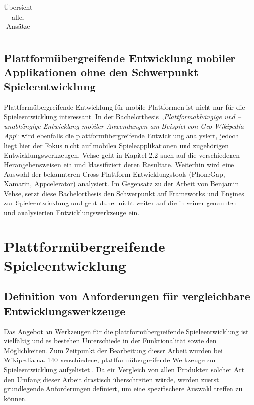\begin{table}[htbp]
{\begin{tabular}{|c|c|p{5cm}|p{6cm}|p{}|}
		\end{tabular}
	}
	\caption{Übersicht aller Ansätze}
	\label{table_all_approaches}
\end{table}

\section{Plattformübergreifende Entwicklung mobiler Applikationen ohne den Schwerpunkt Spieleentwicklung}
Plattformübergreifende Entwicklung für mobile Plattformen ist nicht nur für die Spieleentwicklung interessant.
In der Bachelorthesis „\textit{Plattformabhängige und –unabhängige Entwicklung mobiler Anwendungen am Beispiel von Geo-Wikipedia-App}“ \citep{cross_plattform_development_vehse} wird ebenfalls die plattformübergreifende Entwicklung analysiert, jedoch liegt hier der Fokus nicht auf mobilen Spieleapplikationen und zugehörigen Entwicklungswerkzeugen. Vehse geht in Kapitel 2.2 auch auf die verschiedenen Herangehensweisen ein und klassifiziert deren Resultate. Weiterhin wird eine Auswahl der bekannteren Cross-Plattform Entwicklungstools (PhoneGap, Xamarin, Appcelerator) analysiert. Im Gegensatz zu der Arbeit von Benjamin Vehse, setzt diese Bachelorthesis den Schwerpunkt auf Frameworks und Engines zur Spieleentwicklung und geht daher nicht weiter auf die in seiner genannten und analysierten Entwicklungswerkzeuge ein.


\chapter{Plattformübergreifende Spieleentwicklung}

\section{Definition von Anforderungen für vergleichbare Entwicklungswerkzeuge}
Das Angebot an Werkzeugen für die plattformübergreifende Spieleentwicklung ist vielfältig und es bestehen Unterschiede in der Funktionalität sowie den Möglichkeiten. Zum Zeitpunkt der Bearbeitung dieser Arbeit wurden bei Wikipedia ca. 140 verschiedene, plattformübergreifende Werkzeuge zur Spieleentwicklung aufgelistet \citep{list_of_game_engines}. Da ein Vergleich von allen Produkten solcher Art den Umfang dieser Arbeit drastisch überschreiten würde, werden zuerst grundlegende Anforderungen definiert, um eine spezifischere Auswahl treffen zu können.
 
